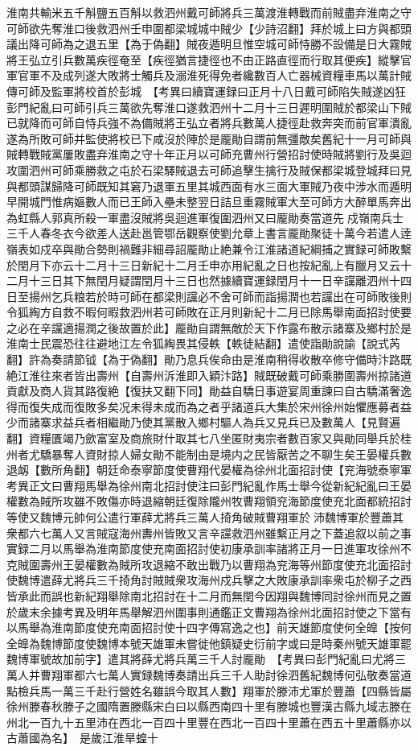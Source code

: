 淮南共輸米五千斛鹽五百斛以救泗州戴可師將兵三萬渡淮轉戰而前賊盡弃淮南之守可師欲先奪淮口後救泗州壬申圍都梁城城中賊少【少詩沼翻】拜於城上曰方與都頭議出降可師為之退五里【為于偽翻】賊夜遁明旦惟空城可師恃勝不設備是日大霧賊將王弘立引兵數萬疾徑奄至【疾徑猶言捷徑也不由正路直徑而行取其便疾】縱擊官軍官軍不及成列遂大敗將士觸兵及溺淮死得免者纔數百人亡器械資糧車馬以萬計賊傳可師及監軍將校首於彭城　【考異曰續寶運録曰正月十八日戴可師陷失賊遂凶狂彭門紀亂曰可師引兵三萬欲先奪淮口遂救泗州十二月十三日遲明圍賊於都梁山下賊已就降而可師自恃兵強不為備賊將王弘立者將兵數萬人捷徑赴救奔突而前官軍潰亂遂為所敗可師并監使將校已下咸沒於陣於是龎勛自謂前無彊敵矣舊紀十一月可師與賊轉戰賊黨屢敗盡弃淮南之守十年正月以可師充曹州行營招討使時賊將劉行及吳迴攻圍泗州可師乘勝救之屯於石梁驛賊退去可師追擊生擒行及賊保都梁城登城拜曰見與都頭謀歸降可師既知其窘乃退軍五里其城西面有水三面大軍賊乃夜中涉水而遁明早開城門惟病嫗數人而已王師入壘未整翌日詰旦重霧賊軍大至可師方大醉單馬奔出為虹縣人郭真所殺一軍盡沒賊將吳迴進軍復圍泗州又曰龎勛奏當道先戍嶺南兵士三千人春冬衣今欲差人送赴邕管鄂岳觀察使劉允章上書言龎勛聚徒十萬今若遣人逹嶺表如戍卒與勛合勢則禍難非細尋詔龎勛止絶兼令江淮諸道紀綱捕之實録可師敗繫於閏月下亦云十二月十三日新紀十二月壬申亦用紀亂之日也按紀亂上有臘月又云十二月十三日其下無閏月疑謂閏月十三日也然據續寶運録閏月十一日辛讜離泗州十四日至揚州乞兵粮若於時可師在都梁則讜必不舍可師而詣揚潤也若讜出在可師敗後則令狐綯方自救不暇何暇救泗州若可師敗在正月則新紀十二月已除馬舉南面招討使要之必在辛讜適揚潤之後故置於此】龎勛自謂無敵於天下作露布散示諸寨及鄉村於是淮南士民震恐往往避地江左令狐綯畏其侵軼【軼徒結翻】遣使詣勛說諭【說式芮翻】許為奏請節钺【為于偽翻】勛乃息兵俟命由是淮南稍得收散卒修守備時汴路既絶江淮往來者皆出壽州【自壽州泝淮即入穎汴路】賊既破戴可師乘勝圍壽州掠諸道貢獻及商人貨其路復絶【復扶又翻下同】勛益自驕日事遊宴周重諫曰自古驕滿奢逸得而復失成而復敗多矣况未得未成而為之者乎諸道兵大集於宋州徐州始懼應募者益少而諸寨求益兵者相繼勛乃使其黨散入鄉村驅人為兵又見兵已及數萬人【見賢遍翻】資糧匱竭乃歛富室及商旅財什取其七八坐匿財夷宗者數百家又與勛同舉兵於桂州者尤驕暴奪人資財掠人婦女勛不能制由是境内之民皆厭苦之不聊生矣王晏權兵數退衂【數所角翻】朝廷命泰寧節度使曹翔代晏權為徐州北面招討使【兖海號泰寧軍　考異正文曰曹翔馬舉為徐州南北招討使注曰彭門紀亂作馬士舉今從新紀紀亂曰王晏權數為賊所攻雖不敗傷亦時退縮朝廷復除隴州牧曹翔領兖海節度使充北面都統招討等使又魏博元帥何公遣行軍薛尤將兵三萬人掎角破賊曹翔軍於沛魏博軍於豐蕭其衆都六七萬人又言賊寇海州夀州皆敗又言辛讜救泗州雖繫正月之下蓋追叙以前之事實録二月以馬舉為淮南節度使充南面招討使初康承訓率諸將正月一日進軍攻徐州不克賊圍壽州王晏權數為賊所攻退縮不敢出戰乃以曹翔為兖海等州節度使充北面招討使魏博遣薛尤將兵三千掎角討賊賊衆攻海州戍兵擊之大敗康承訓率衆屯於柳子之西皆承此而誤也新紀翔舉除南北招討在十二月而無閏今因翔與魏博同討徐州而見之置於歲末余據考異及明年馬舉解泗州圍事則通鑑正文曹翔為徐州北面招討使之下當有以馬舉為淮南節度使充南面招討使十四字傳寫逸之也】前天雄節度使何全皥【按何全皥為魏博節度使魏博本號天雄軍未嘗徙他鎮疑史衍前字或曰是時秦州號天雄軍罷魏博軍號故加前字】遣其將薛尤將兵萬三千人討龎勛　【考異曰彭門紀亂曰尤將三萬人并曹翔軍都六七萬人實録魏博奏請出兵三千人助討徐泗舊紀魏博何弘敬奏當道點檢兵馬一萬三千赴行營姓名雖誤今取其人數】翔軍於滕沛尤軍於豐蕭【四縣皆屬徐州滕春秋滕子之國隋置滕縣宋白曰以縣西南四十里有滕城也豐漢古縣九域志滕在州北一百九十五里沛在西北一百四十里豐在西北一百四十里蕭在西五十里蕭縣亦以古蕭國為名】　是歲江淮旱蝗十